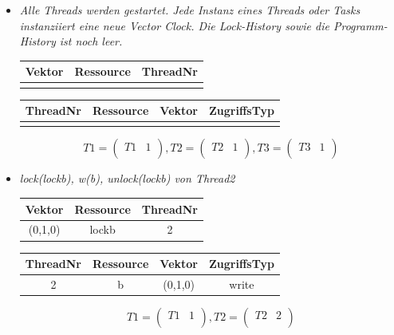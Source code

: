\documentclass[10pt,a4paper]{article}
\begin{document}
\begin{itemize}
\item \textit{Alle Threads werden gestartet. Jede Instanz eines Threads oder Tasks instanziiert eine neue Vector Clock. Die Lock-History sowie die Programm-History ist noch leer.}\\[0.3cm]
\begin{tabular}{ >{\small}c >{\small}c >{\small}c }
  	Vektor & Ressource & ThreadNr \\\hline
  	  &   &   \\\hline
\end{tabular}\hspace*{0.5cm}
\begin{tabular}{ >{\small}c >{\small}c >{\small}c >{\small}c }
  	ThreadNr & Ressource & Vektor & ZugriffsTyp \\\hline
  	  &   &   &   \\\hline
\end{tabular}
\[
	T1 = \begin{pmatrix}
		T1 & 1\\
	\end{pmatrix}
	, T2 = \begin{pmatrix}
		T2 & 1\\
	\end{pmatrix}
	, T3 = \begin{pmatrix}
		T3 & 1\\
	\end{pmatrix}
\]
\item \textit{lock(lockb), w(b), unlock(lockb) von Thread2}\\[0.3cm]
\begin{tabular}{ >{\small}c >{\small}c >{\small}c }
  	Vektor & Ressource & ThreadNr \\\hline
  	(0,1,0) & lockb & 2 \\\hline
\end{tabular}\hspace*{0.5cm}
\begin{tabular}{ >{\small}c >{\small}c >{\small}c >{\small}c }
  	ThreadNr & Ressource & Vektor & ZugriffsTyp \\\hline
  	2 & b & (0,1,0) & write \\\hline
\end{tabular}
\[
	T1 = \begin{pmatrix}
		T1 & 1\\
	\end{pmatrix}
	, T2 = \begin{pmatrix}
		T2 & 2\\

\end{pmatrix}\]
\end{itemize}
\end{document}
